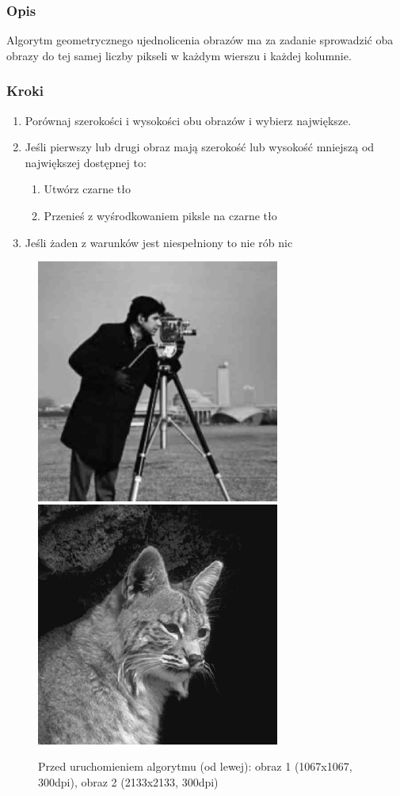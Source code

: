 \documentclass[a4paper,12pt]{book}
\begin{document}
\subsubsection*{Opis}
Algorytm geometrycznego ujednolicenia obrazów ma za zadanie sprowadzić oba obrazy do tej samej liczby pikseli w każdym wierszu i każdej kolumnie. 
\subsubsection*{Kroki}
\begin{enumerate}
	\item Porównaj szerokości i wysokości obu obrazów i wybierz największe. 
	\item Jeśli pierwszy lub drugi obraz mają szerokość lub wysokość mniejszą od największej dostępnej to:
	\begin{enumerate}
		\item Utwórz czarne tło
		\item Przenieś z wyśrodkowaniem piksle na czarne tło
	\end{enumerate}
	\item Jeśli żaden z warunków jest niespełniony to nie rób nic
\end{enumerate}
\begin{figure}
	\caption{Przed uruchomieniem algorytmu (od lewej): obraz 1 (1067x1067, 300dpi), obraz 2 (2133x2133, 300dpi)}
	\includegraphics[width=8cm, height=8cm]{man-unmodified.jpg}
	\includegraphics[width=8cm, height=8cm]{cat-unmodified.jpg}
\end{figure}
\end{document}
